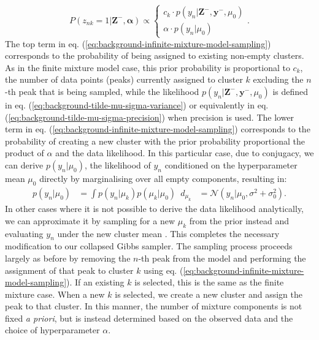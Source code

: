 \begin{equation}
P(z_{nk}=1 \vert \boldsymbol{Z}^{-}, \boldsymbol{\alpha}) \propto 
\begin{cases}
    c_k \cdot p(y_n \vert \boldsymbol{Z}^{-},  \boldsymbol{y}^{-}, \mu_0) \\
    \alpha \cdot p(y_n \vert \mu_0)
\end{cases}.
\label{eq:background-infinite-mixture-model-sampling}
\end{equation}
The top term in eq. (\ref{eq:background-infinite-mixture-model-sampling}) corresponds to the probability of being assigned to existing non-empty clusters. As in the finite mixture model case, this prior probability is proportional to $c_k$, the number of data points (peaks) currently assigned to cluster $k$ excluding the $n$-th peak that is being sampled, while the likelihood $p(y_n \vert \boldsymbol{Z}^{-},  \boldsymbol{y}^{-}, \mu_0)$ is defined in eq. (\ref{eq:background-tilde-mu-sigma-variance}) or equivalently in eq. (\ref{eq:background-tilde-mu-sigma-precision}) when precision is used. The lower term in eq. (\ref{eq:background-infinite-mixture-model-sampling}) corresponds to the probability of creating a new cluster with the prior probability proportional the product of $\alpha$ and the data likelihood. In this particular case, due to conjugacy, we can derive $p(y_n \vert \mu_0)$, the likelihood of $y_n$ conditioned on the hyperparameter mean $\mu_0$ directly by marginalising over all empty components, resulting in:
\begin{equation}
\begin{aligned}
p(y_n \vert \mu_0) &= \int p(y_n \vert \mu_k) p(\mu_k \vert \mu_0) \enspace d_{\mu_k}
                               &= \mathcal{N}(y_n \vert \mu_0, \sigma^2 + \sigma_0^2).
\end{aligned}
\label{eq:background-new-table-likelihood}
\end{equation}
In other cases where it is not possible to derive the data likelihood analytically, we can approximate it by sampling for a new $\mu_k$ from the prior instead and evaluating $y_n$ under the new cluster mean \cite{Rasmussen2000}. This completes the necessary modification to our collapsed Gibbs sampler. The sampling process proceeds largely as before by removing the $n$-th peak from the model and performing the assignment of that peak to cluster $k$ using eq. (\ref{eq:background-infinite-mixture-model-sampling}). If an existing $k$ is selected, this is the same as the finite mixture case. When a new $k$ is selected, we create a new cluster and assign the peak to that cluster. In this manner, the number of mixture components is not fixed \textit{a priori}, but is instead determined based on the observed data and the choice of hyperparameter $\alpha$.

